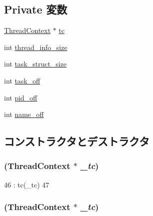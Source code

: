 \subsection*{Private 変数}
\begin{DoxyCompactItemize}
\item 
\hyperlink{classThreadContext}{ThreadContext} $\ast$ \hyperlink{classMipsISA_1_1ProcessInfo_a7d1b4bb6199b71a875f0eb5d9c19022b}{tc}
\item 
int \hyperlink{classMipsISA_1_1ProcessInfo_aa02520c2e86b94388e0d4f4a7b0873b3}{thread\_\-info\_\-size}
\item 
int \hyperlink{classMipsISA_1_1ProcessInfo_a6bca839d8255baba5c53a5eace70d72e}{task\_\-struct\_\-size}
\item 
int \hyperlink{classMipsISA_1_1ProcessInfo_ad17cb97383cfef8dd965eb3a7e66aae1}{task\_\-off}
\item 
int \hyperlink{classMipsISA_1_1ProcessInfo_a8f4dbd24e9c86dd360c08e6e2e98cbcb}{pid\_\-off}
\item 
int \hyperlink{classMipsISA_1_1ProcessInfo_aaffc7baa14183a2f0faa8d8d51d0889b}{name\_\-off}
\end{DoxyCompactItemize}


\subsection{コンストラクタとデストラクタ}
\hypertarget{classMipsISA_1_1ProcessInfo_a9c31978febe8b0cc8e9e76eb6791312b}{
\subsubsection[{ProcessInfo}]{ ({\bf ThreadContext} $\ast$ {\em \_\-tc})}}
\label{classMipsISA_1_1ProcessInfo_a9c31978febe8b0cc8e9e76eb6791312b}



\begin{DoxyCode}
46                                            : tc(_tc)
47 {}
\end{DoxyCode}
\hypertarget{classMipsISA_1_1ProcessInfo_a9c31978febe8b0cc8e9e76eb6791312b}{
\subsubsection[{ProcessInfo}]{ ({\bf ThreadContext} $\ast$ {\em \_\-tc})}}
\label{classMipsISA_1_1ProcessInfo_a9c31978febe8b0cc8e9e76eb6791312b}


